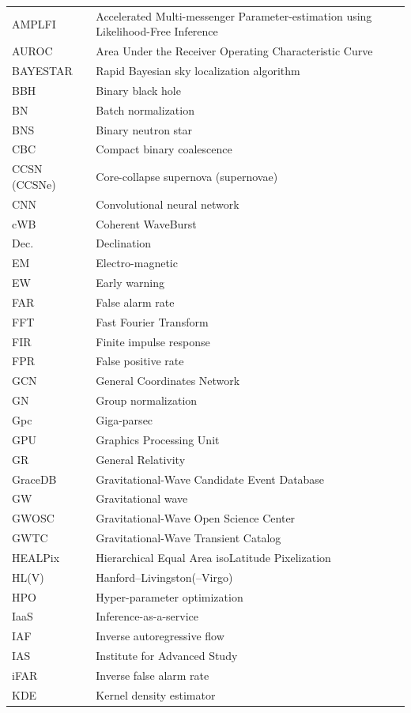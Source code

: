 \begin{longtable}{p{} p{}}
AMPLFI & Accelerated Multi-messenger Parameter-estimation using Likelihood-Free Inference \\
AUROC & Area Under the Receiver Operating Characteristic Curve \\
BAYESTAR & Rapid Bayesian sky localization algorithm \\
BBH & Binary black hole \\
BN & Batch normalization \\
BNS & Binary neutron star \\
CBC & Compact binary coalescence \\
CCSN (CCSNe) & Core-collapse supernova (supernovae) \\
CNN & Convolutional neural network \\
cWB & Coherent WaveBurst \\
Dec. & Declination \\
EM & Electro-magnetic \\
EW & Early warning \\
FAR & False alarm rate \\
FFT & Fast Fourier Transform \\
FIR & Finite impulse response \\
FPR & False positive rate \\
GCN & General Coordinates Network \\
GN & Group normalization \\
Gpc & Giga-parsec \\
GPU & Graphics Processing Unit \\
GR & General Relativity \\
GraceDB & Gravitational-Wave Candidate Event Database \\
GW & Gravitational wave \\
GWOSC & Gravitational-Wave Open Science Center \\
GWTC & Gravitational-Wave Transient Catalog \\
HEALPix & Hierarchical Equal Area isoLatitude Pixelization \\
HL(V) & Hanford--Livingston(--Virgo) \\
HPO & Hyper-parameter optimization \\
IaaS & Inference-as-a-service \\
IAF & Inverse autoregressive flow \\
IAS & Institute for Advanced Study \\
iFAR & Inverse false alarm rate \\
KDE & Kernel density estimator \\

\end{longtable}
